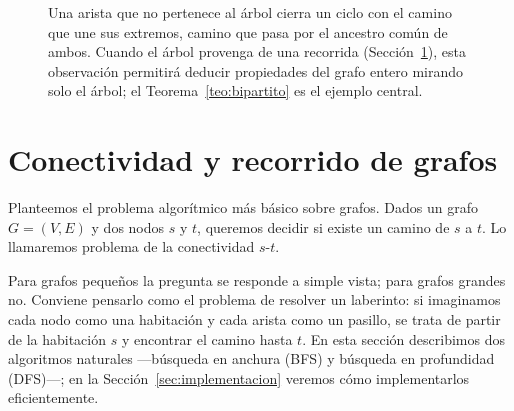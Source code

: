 \documentclass[12pt, spanish, oneside, openany]{book}
\theoremstyle{uprightplain}
\theoremstyle{definition}
\theoremstyle{remark}
\theoremstyle{definition}
\begin{document}
\begin{figure}[H]
\centering
{}
\caption{Una arista que no pertenece al árbol cierra un ciclo con el camino que
une sus extremos, camino que pasa por el ancestro común de ambos. Cuando el
árbol provenga de una recorrida (Sección~\ref{sec:recorridos}), esta
observación permitirá deducir propiedades del grafo entero mirando solo el
árbol; el Teorema~\ref{teo:bipartito} es el ejemplo central.}
\label{fig:arbol-mas-arista}
\end{figure}

\section{Conectividad y recorrido de grafos}
\label{sec:recorridos}

Planteemos el problema algorítmico más básico sobre grafos. Dados un grafo $G=(V,E)$ y dos nodos $s$ y $t$, queremos decidir si existe un camino de $s$ a $t$. Lo llamaremos problema de la conectividad $s$-$t$.

Para grafos pequeños la pregunta se responde a simple vista; para grafos grandes no. Conviene pensarlo como el problema de resolver un laberinto: si imaginamos cada nodo como una habitación y cada arista como un pasillo, se trata de partir de la habitación $s$ y encontrar el camino hasta $t$. En esta sección describimos dos algoritmos naturales ---búsqueda en anchura (BFS) y búsqueda en profundidad (DFS)---; en la Sección~\ref{sec:implementacion} veremos cómo implementarlos eficientemente.
\end{document}
